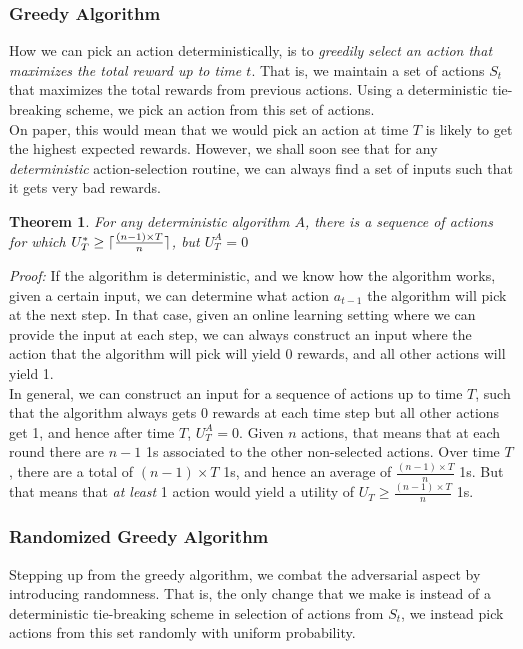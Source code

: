 \documentclass[12pt]{article}
\DeclarePairedDelimiter\ceil{\lceil}{\rceil}
\newtheorem{theorem}{Theorem}
\begin{document}
\subsubsection{Greedy Algorithm}

How we can pick an action deterministically, is to \textit{greedily select an action that maximizes the total reward up to time $t$}. That is, we maintain a set of actions $S_t$ that maximizes the total rewards from previous actions. Using a deterministic tie-breaking scheme, we pick an action from this set of actions.\\

On paper, this would mean that we would pick an action at time $T$ is likely to get the highest expected rewards. However, we shall soon see that for any \textit{deterministic} action-selection routine, we can always find a set of inputs such that it gets very bad rewards.

\begin{theorem}
For any deterministic algorithm $A$, there is a sequence of actions for which $U^*_T \geq \ceil{\frac{(n-1)\times T}{n}}$, but $U^A_T = 0$
\end{theorem}

\textit{Proof:} If the algorithm is deterministic, and we know how the algorithm works, given a certain input, we can determine what action $a_{t-1}$ the algorithm will pick at the next step. In that case, given an online learning setting where we can provide the input at each step, we can always construct an input where the action that the algorithm will pick will yield 0 rewards, and all other actions will yield 1.\\

In general, we can construct an input for a sequence of actions up to time $T$, such that the algorithm always gets 0 rewards at each time step but all other actions get 1, and hence after time $T$, $U^A_T = 0$. Given $n$ actions, that means that at each round there are $n-1$ 1s associated to the other non-selected actions. Over time $T$, there are a total of $(n-1) \times T$ 1s, and hence an average of $\frac{(n-1) \times T}{n}$ 1s. But that means that \textit{at least} 1 action would yield a utility of $U_T \geq \frac{(n-1) \times T}{n}$ 1s.

\subsubsection{Randomized Greedy Algorithm}

Stepping up from the greedy algorithm, we combat the adversarial aspect by introducing randomness. That is, the only change that we make is instead of a deterministic tie-breaking scheme in selection of actions from $S_t$, we instead pick actions from this set randomly with uniform probability. 
\end{document}
